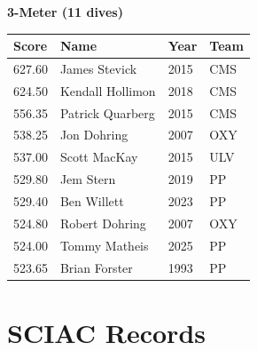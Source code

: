 \vspace{1.2em}
\noindent\begin{minipage}[t]{0.98\textwidth}
\centering
\textbf{\textcolor{teamprimary}{3-Meter (11 dives)}}\par
\vspace{0.5em}
\centering
\small
\renewcommand{\arraystretch}{1.0}
\setlength{\tabcolsep}{4pt}
\begin{tabular}{@{}p{2.5cm}p{4.5cm}p{1.5cm}p{2.5cm}@{}}
\toprule
\textbf{Score} & \textbf{Name} & \textbf{Year} & \textbf{Team} \\
\midrule
627.60 & James Stevick & 2015 & CMS \\
624.50 & Kendall Hollimon & 2018 & CMS \\
556.35 & Patrick Quarberg & 2015 & CMS \\
538.25 & Jon Dohring & 2007 & OXY \\
537.00 & Scott MacKay & 2015 & ULV \\
529.80 & Jem Stern & 2019 & PP \\
529.40 & Ben Willett & 2023 & PP \\
524.80 & Robert Dohring & 2007 & OXY \\
524.00 & Tommy Matheis & 2025 & PP \\
523.65 & Brian Forster & 1993 & PP \\
\bottomrule
\end{tabular}
\end{minipage}
\vspace{-0.5em}
\clearpage
\section{SCIAC Records}
\clearpage
